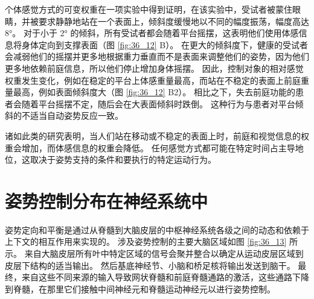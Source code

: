 个体感觉方式的可变权重在一项实验中得到证明，在该实验中，受试者被蒙住眼睛，并被要求静静地站在一个表面上，倾斜度缓慢地以不同的幅度振荡，幅度高达 8°。 对于小于 2° 的倾斜，所有受试者都会随着平台摇摆，这表明他们使用体感信息将身体定向到支撑表面（图 \ref{fig:36_12} B）。 
在更大的倾斜度下，健康的受试者会减弱他们的摇摆并更多地根据重力垂直而不是表面来调整他们的姿势，因为他们更多地依赖前庭信息，所以他们停止增加身体摇摆。
因此，控制对象的相对感觉权重发生变化，例如在稳定的平台上体感重量最高，而站在不稳定的表面上前庭重量最高，例如表面倾斜度大（图 \ref{fig:36_12} B2）。
相比之下，失去前庭功能的患者会随着平台摇摆不定，随后会在大表面倾斜时跌倒。
这种行为与患者对平台倾斜的不适当自动姿势反应一致。


诸如此类的研究表明，当人们站在移动或不稳定的表面上时，前庭和视觉信息的权重会增加，而体感信息的权重会降低。
任何感觉方式都可能在特定时间占主导地位，这取决于姿势支持的条件和要执行的特定运动行为。



\section{姿势控制分布在神经系统中}

姿势定向和平衡是通过从脊髓到大脑皮层的中枢神经系统各级之间的动态和依赖于上下文的相互作用来实现的。 
涉及姿势控制的主要大脑区域如图 \ref{fig:36_13} 所示。
来自大脑皮层所有叶中特定区域的信号会聚并整合以确定从运动皮层区域到皮层下结构的适当输出。
然后基底神经节、小脑和桥足核将输出发送到脑干。
最终，来自这些不同来源的输入导致网状脊髓和前庭脊髓通路的激活，这些通路下降到脊髓，在那里它们接触中间神经元和脊髓运动神经元以进行姿势控制。


